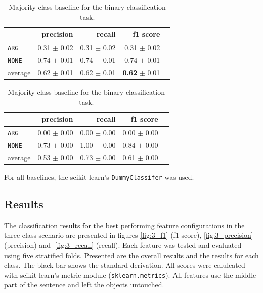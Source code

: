 \begin{table}[!htb]
    \begin{minipage}{.5\linewidth}
      \caption{Random (stratified) baseline for the binary classification task.}
      \label{tbl:binmaj}
      \centering
      
\begin{tabular}{@{}lrrrr@{}}
\toprule
 	&	 precision &	 recall &	 f1 score  \\ \midrule 
\texttt{ARG}	&	 0.31 \scriptsize{$\pm$ 0.02} &	 0.31 \scriptsize{$\pm$ 0.02} &	 0.31 \scriptsize{$\pm$ 0.02}  \\ 
\texttt{NONE}	&	 0.74 \scriptsize{$\pm$ 0.01} &	 0.74 \scriptsize{$\pm$ 0.01} &	 0.74 \scriptsize{$\pm$ 0.01}  \\ 
average	&	 0.62 \scriptsize{$\pm$ 0.01} &	 0.62 \scriptsize{$\pm$ 0.01} &	 \textbf{0.62} \scriptsize{$\pm$ 0.01}  \\ 
\bottomrule
\end{tabular}

  \end{minipage}%
    \begin{minipage}{.5\linewidth}
      \centering
        \caption{Majority class baseline for the binary classification task.}
        \label{tbl:binstrat}
\begin{tabular}{@{}lrrrr@{}}
\toprule
 	&	 precision &	 recall &	 f1 score  \\ \midrule 
\texttt{ARG}	&	 0.00 \scriptsize{$\pm$ 0.00} &	 0.00 \scriptsize{$\pm$ 0.00} &	 0.00 \scriptsize{$\pm$ 0.00}  \\ 
\texttt{NONE}	&	 0.73 \scriptsize{$\pm$ 0.00} &	 1.00 \scriptsize{$\pm$ 0.00} &	 0.84 \scriptsize{$\pm$ 0.00}  \\ 
average	&	 0.53 \scriptsize{$\pm$ 0.00} &	 0.73 \scriptsize{$\pm$ 0.00} &	 0.61 \scriptsize{$\pm$ 0.00}  \\ 
\bottomrule
\end{tabular}
    \end{minipage} 
\end{table}


For all baselines, the scikit-learn's \texttt{DummyClassifer} was used.

\subsection{Results}
\label{sec:3_results}
The classification results for the best performing feature configurations in the three-class scenario are presented in figures \ref{fig:3_f1} (f1 score), \ref{fig:3_precision} (precision) and \ref{fig:3_recall} (recall). Each feature was tested and evaluated using five stratified folds. Presented are the overall results and the results for each class. The black bar shows the standard derivation. All scores were calulcated with scikit-learn's metric module (\texttt{sklearn.metrics}). All features use the middle part of the sentence and left the objects untouched.


